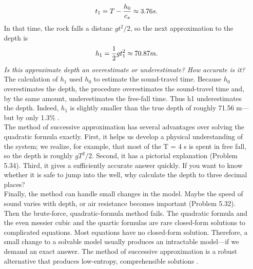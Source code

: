 \documentclass{book}
\newcounter{pro1}
\begin{document}
 
\pagestyle{fancy} 

\renewcommand{\headrulewidth}{0pt}
\fancyhf{} %

\begin{equation} 
\Large t_{1}=T-\frac{h_{0}}{c_{s}}\approx 3.76s.
\end{equation} 
\Large \textrm{In that time, the rock falls a distanc $gt^{2}/2$, so the next approximation to the depth is} 
\begin{equation}
\Large h_{1}=\frac{1}{2}gt_{1}^{2}\approx 70.87m.
\end{equation} 
 \large\textsl{Is this approximate depth an overestimate or underestimate? How accurate is it?} \\ 
\Large \textrm{The calculation of $h_{1}$ used $h_{0}$ to estimate the sound-travel time. Because 
$h_{0}$ overestimates the depth, the procedure overestimates the sound-travel 
time and, by the same amount, underestimates the free-fall time. Thus 
h1 underestimates the depth. Indeed, $h_{1}$ is slightly smaller than the true 
depth of roughly 71.56 m—but by only 1.3\% .} \\ 
\Large\textrm{The method of successive approximation has several advantages over solving the quadratic formula exactly. First, it helps us develop a physical 
understanding of the system; we realize, for example, that most of the 
T = 4 s is spent in free fall, so the depth is roughly $gT^{2}/2$. Second, it 
has a pictorial explanation (Problem 5.34). Third, it gives a sufficiently 
accurate answer quickly. If you want to know whether it is safe to jump 
into the well, why calculate the depth to three decimal places?} \\ 
\Large\textrm{Finally, the method can handle small changes in the model. Maybe the 
speed of sound varies with depth, or air resistance becomes important 
(Problem 5.32). Then the brute-force, quadratic-formula method fails. The 
quadratic formula and the even messier cubic and the quartic formulas 
are rare closed-form solutions to complicated equations. Most equations 
have no closed-form solution. Therefore, a small change to a solvable 
model usually produces an intractable model—if we demand an exact 
answer. The method of successive approximation is a robust alternative 
that produces low-entropy, comprehensible solutions .} \\ 
\end{document}
